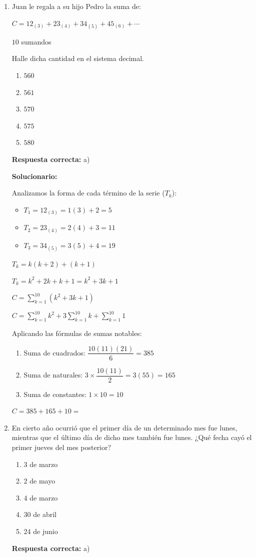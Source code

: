 \begin{enumerate}[resume]
	
	\item Juan le regala a su hijo Pedro la suma de:
	
	$C=12_{(3)}+23_{(4)}+34_{(5)}+45_{(6)}+\cdots$
	
	$10$ sumandos
	
	Halle dicha cantidad en el sistema decimal.
	\begin{enumerate}[label=\alph*)]
		\item $560$
		\item $561$
		\item $570$
		\item $575$
		\item $580$
	\end{enumerate}
	\textbf{Respuesta correcta:} a)
	
	\vspace{2mm}
	\textbf{Solucionario:}


	Analizamos la forma de cada término de la serie ($T_k$):
	\begin{itemize}
		\item $T_1 = 12_{(3)} = 1(3) + 2 = 5$
		\item $T_2 = 23_{(4)} = 2(4) + 3 = 11$
		\item $T_3 = 34_{(5)} = 3(5) + 4 = 19$
	\end{itemize}
	
	$ T_k = k(k+2) + (k+1) $
	
	$ T_k = k^2 + 2k + k + 1 = k^2 + 3k + 1 $
	
	$ C = \sum_{k=1}^{10} (k^2 + 3k + 1) $
	
	$ C = \sum_{k=1}^{10} k^2 + 3\sum_{k=1}^{10} k + \sum_{k=1}^{10} 1 $
	
	Aplicando las fórmulas de sumas notables:
	\begin{enumerate}
		\item Suma de cuadrados: $\dfrac{10(11)(21)}{6} = 385$
		\item Suma de naturales: $3 \times \dfrac{10(11)}{2} = 3(55) = 165$
		\item Suma de constantes: $1 \times 10 = 10$
	\end{enumerate}
	

	$C = 385 + 165 + 10 =$
	
	\vspace{6mm}
	
	\item En cierto año ocurrió que el primer día de un determinado mes fue lunes, mientras que el último día de dicho mes también fue lunes. ¿Qué fecha cayó el primer jueves del mes posterior?
	\begin{enumerate}[label=\alph*)]
		\item 3 de marzo
		\item 2 de mayo
		\item 4 de marzo
		\item 30 de abril
		\item 24 de junio
	\end{enumerate}
	\textbf{Respuesta correcta:} a)
	

\end{enumerate}
